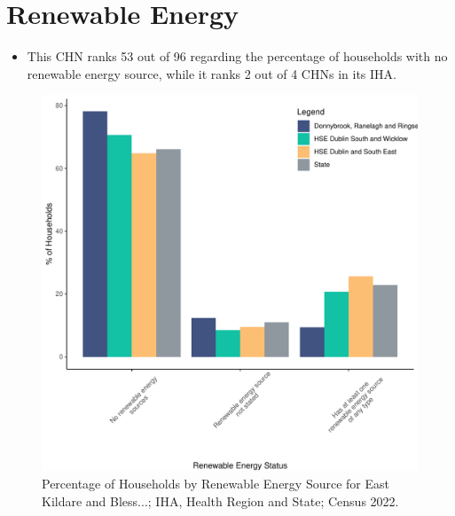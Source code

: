 \documentclass{article}
\begin{document}
\section{Renewable Energy}\label{sect:RE}
\begin{itemize}
\item This CHN ranks  53 out of 96 regarding the percentage of households with no renewable energy source, while it ranks   2 out of 4 CHNs in its IHA.
\end{itemize}
\begin{figure}[H]
	\centering
	\includegraphics[width = 140mm]{../figures/RenewableEnergyED.pdf}
	\caption{Percentage of Households by Renewable Energy Source for East Kildare and Bless...; IHA, Health Region and State; Census 2022.}
	\label{fig:vbnv}
	\end{figure}
\end{document}
